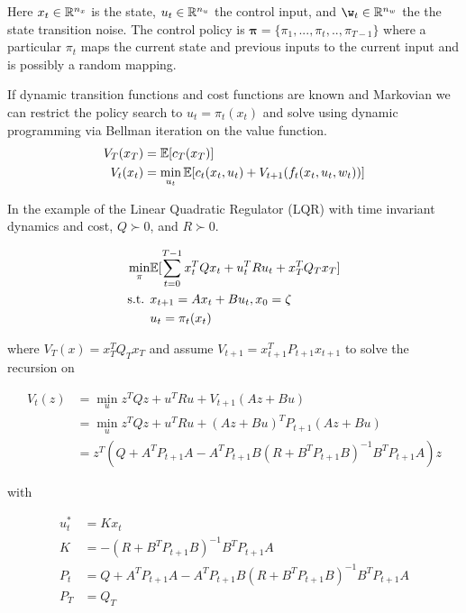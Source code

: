 \documentclass{article}[12pt]
\begin{document}
Here $x_t \in \mathbb{R}^{n_x}$ is the state, $u_t \in \mathbb{R}^{n_u}$ the control input, and $\w_t \in \R^{n_w}$ the the state transition noise. The control policy is $\mathbf{\pi} = \{\pi_1,...,\pi_t,..,\pi_{T-1}\}$ where a particular $\pi_t$ maps the current state and previous inputs to the current input and is possibly a random mapping.

If dynamic transition functions and cost functions are known and Markovian we can restrict the policy search to $u_t = \pi_t(x_{t})$ and solve using dynamic programming via Bellman iteration on the value function.
\begin{equation}
\begin{split}
V_T(x_T) &= \mathbb{E}[c_T(x_T)] \\
V_t(x_t) &= \min_{u_t} \mathbb{E}[c_t(x_t,u_t) +  V_{t+1}(f_t(x_t,u_t,w_t))]
\end{split}
\end{equation}


In the example of the Linear Quadratic Regulator (LQR) with time invariant dynamics and cost, $Q \succ 0$, and $R \succ 0$.

\begin{equation}
\begin{split}
   \min_\pi & \mathbb{E} [\sum_{t=0}^{T-1} x_t^TQx_t + u_t^TRu_t + x_T^TQ_Tx_T ] \\
   \mbox{s.t. } & x_{t+1} = Ax_t + Bu_t , x_0 = \zeta \\
   & u_t = \pi_t(x_{t})
\end{split}
\end{equation}


where $V_T(x) = x_T^TQ_Tx_T$ and assume $V_{t+1} = x_{t+1}^TP_{t+1}x_{t+1}$ to solve the recursion on

\begin{equation}
    \begin{split}
       V_t(z) &= \min_u z^TQz + u^TRu + V_{t+1}(Az+Bu) \\
       &= \min_u z^TQz + u^TRu + (Az+Bu)^TP_{t+1}(Az+Bu) \\
       &= z^T(Q+A^TP_{t+1}A-A^TP_{t+1}B(R+B^TP_{t+1}B)^{-1}B^TP_{t+1}A)z
    \end{split}
\end{equation}

with 

\begin{equation}
    \begin{split}
        u_t^* &= Kx_t \\
        K &= -(R+B^TP_{t+1}B)^{-1}B^TP_{t+1}A \\
        P_t &= Q+A^TP_{t+1}A-A^TP_{t+1}B(R+B^TP_{t+1}B)^{-1}B^TP_{t+1}A \\
        P_T &= Q_T
    \end{split}
\end{equation}
\end{document}

